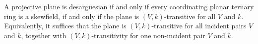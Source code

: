 A projective plane is desarguesian if and only if every coordinating planar ternary ring is a skewfield, if and only if the plane is $(V,k)$-transitive for all $V$ and $k$. Equivalently, it suffices that the plane is $(V,k)$-transitive for all incident pairs $V$ and $k$, together with $(V,k)$-transitivity for one non-incident pair $V$ and $k$.
